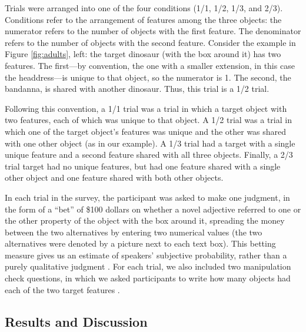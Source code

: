 \documentclass[man,noapacite]{apa2}
\begin{document}
Trials were arranged into one of the four conditions (1/1, 1/2, 1/3, and 2/3). Conditions refer to the arrangement of features among the three objects: the numerator refers to the number of objects with the first feature. The denominator refers to the number of objects with the second feature. Consider the example in Figure \ref{fig:adults}, left: the target dinosaur (with the box around it) has two features. The first---by convention, the one with a smaller extension, in this case the headdress---is unique to that object, so the numerator is 1. The second, the bandanna, is shared with another dinosaur. Thus, this trial is a 1/2 trial. 

Following this convention, a 1/1 trial was a trial in which a target object with two features, each of which was unique to that object. A 1/2 trial was a trial in which one of the target object's features was unique and the other was shared with one other object (as in our example). A 1/3 trial had a target with a single unique feature and a second feature shared with all three objects. Finally, a 2/3 trial target had no unique features, but had one feature shared with a single other object and one feature shared with both other objects. 

In each trial in the survey, the participant was asked to make one judgment, in the form of a ``bet'' of \$100 dollars on whether a novel adjective referred to one or the other property of the object with the box around it, spreading the money between the two alternatives by entering two numerical values (the two alternatives were denoted by a picture next to each text box). This betting measure gives us an estimate of speakers' subjective probability, rather than a purely qualitative judgment \cite{frank2012}. For each trial, we also included two manipulation check questions, in which we asked participants to write how many objects had each of the two target features \cite{oppenheimer2009,crump2013}. 

\subsection{Results and Discussion}
\end{document}
